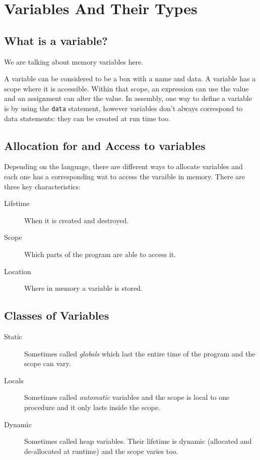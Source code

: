 \section{Variables And Their Types}\label{sec:variables_and_their_types}

\subsection{What is a variable?}\label{sub:what_is_a_variable_}

\begin{note}
	We are talking about memory variables here.
\end{note}
A variable can be considered to be a box with a name and data.
A variable has a scope where it is accessible.
Within that scope, an expression can use the value and an assignment can alter the value.
In assembly, one way to define a variable is by using the \texttt{data} statement, however variables don't always correspond to data statements: they can be created at run time too.

\subsection{Allocation for and Access to variables}\label{sub:allocation_for_and_access_to_variables}

Depending on the language, there are different ways to allocate variables and each one has a corresponding wat to access the varaible in memory.
There are three key characteristics:
\begin{description}
	\item[Lifetime] When it is created and destroyed.
	\item[Scope] Which parts of the program are able to access it.
	\item[Location] Where in memory a variable is stored.
\end{description}

\subsection{Classes of Variables}\label{sub:classes_of_variables}

\begin{description}
	\item[Static] Sometimes called \emph{globals} which last the entire time of the program and the scope can vary.
	\item[Locals] Sometimes called \emph{automatic} variables and the scope is local to one procedure and it only lasts inside the scope.
	\item[Dynamic] Sometimes called heap variables. Their lifetime is dynamic (allocated and de-allocated at runtime) and the scope varies too.
\end{description}

